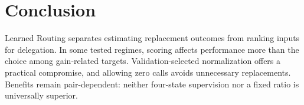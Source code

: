 \section{Conclusion}
Learned Routing separates estimating replacement outcomes from ranking inputs for delegation. In some tested regimes, scoring affects performance more than the choice among gain-related targets. Validation-selected normalization offers a practical compromise, and allowing zero calls avoids unnecessary replacements. Benefits remain pair-dependent: neither four-state supervision nor a fixed ratio is universally superior.
